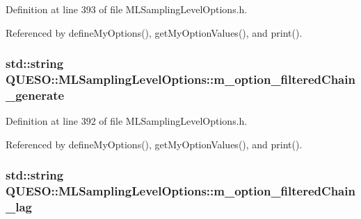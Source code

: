 Definition at line 393 of file M\-L\-Sampling\-Level\-Options.\-h.



Referenced by define\-My\-Options(), get\-My\-Option\-Values(), and print().

\hypertarget{class_q_u_e_s_o_1_1_m_l_sampling_level_options_a889952cbad52c41c179ff6ffecf82dd7}{
\subsubsection[{m\-\_\-option\-\_\-filtered\-Chain\-\_\-generate}]{\setlength{\rightskip}{0pt plus 5cm}std\-::string Q\-U\-E\-S\-O\-::\-M\-L\-Sampling\-Level\-Options\-::m\-\_\-option\-\_\-filtered\-Chain\-\_\-generate\hspace{0.3cm}{\ttfamily [private]}}}\label{class_q_u_e_s_o_1_1_m_l_sampling_level_options_a889952cbad52c41c179ff6ffecf82dd7}


Definition at line 392 of file M\-L\-Sampling\-Level\-Options.\-h.



Referenced by define\-My\-Options(), get\-My\-Option\-Values(), and print().

\hypertarget{class_q_u_e_s_o_1_1_m_l_sampling_level_options_a52e58ef7b6d840b8c6f7d505ba9cf1b2}{
\subsubsection[{m\-\_\-option\-\_\-filtered\-Chain\-\_\-lag}]{\setlength{\rightskip}{0pt plus 5cm}std\-::string Q\-U\-E\-S\-O\-::\-M\-L\-Sampling\-Level\-Options\-::m\-\_\-option\-\_\-filtered\-Chain\-\_\-lag\hspace{0.3cm}{\ttfamily [private]}}}\label{class_q_u_e_s_o_1_1_m_l_sampling_level_options_a52e58ef7b6d840b8c6f7d505ba9cf1b2}


